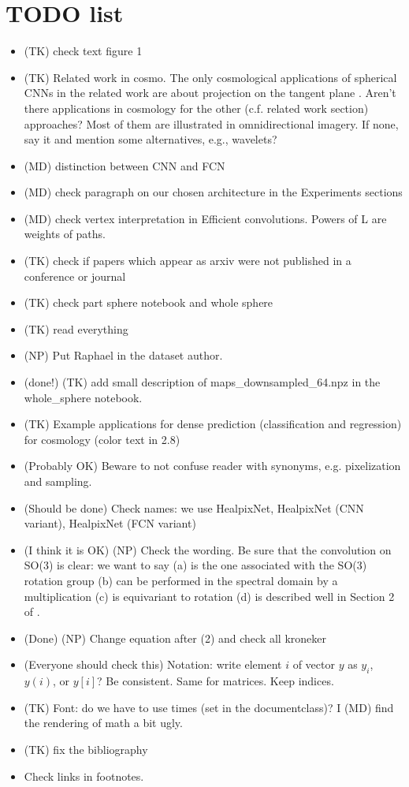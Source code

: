 \documentclass[final,twocolumn,3p,times,authoryear]{elsarticle}
\newcommand{\nati}[1]{{\color[rgb]{.1,.6,.1}{#1}}}
\newcommand{\1}{\b{1}}              %
\newcommand{\0}{\b{0}}              %
\begin{document}
\section*{TODO list}
\begin{itemize}[noitemsep,topsep=0pt,parsep=0pt,partopsep=0pt]
    \item (TK) check text figure 1
	\item (TK) Related work in cosmo. The only cosmological applications of spherical CNNs in the related work are about projection on the tangent plane \citep{schmelze2017cosmologicalmodel, fluri2018deep, gupta2018nongaussianinformation}. Aren't there applications in cosmology for the other (c.f. related work section) approaches? Most of them are illustrated in omnidirectional imagery. If none, say it and mention some alternatives, e.g., wavelets?
	\item (MD) distinction between CNN and FCN
	\item (MD) check paragraph on our chosen architecture in the Experiments sections
    \item (MD) check vertex interpretation in Efficient convolutions. Powers of L are weights of paths.
    \item (TK) check if papers which appear as arxiv were not published in a conference or journal
    \item (TK) check part sphere notebook and whole sphere
    \item (TK) read everything
    \item (NP) Put Raphael in the dataset author. 
    \item (done!) (TK) add small description of maps\_downsampled\_64.npz in the whole\_sphere notebook. \nati{We need to talk about that.}
	\item (TK) Example applications for dense prediction (classification and regression) for cosmology (color text in 2.8)
	\item (Probably OK) Beware to not confuse reader with synonyms, e.g. pixelization and sampling.
	\item (Should be done) Check names: we use HealpixNet, HealpixNet (CNN variant), HealpixNet (FCN variant)
    \item (I think it is OK) (NP) Check the wording. Be sure that the convolution on SO(3) is clear: we want to say (a) is the one associated with the SO(3) rotation group (b) can be performed  in the spectral domain by a multiplication (c) is equivariant to rotation (d) is described well in Section 2 of \citep{kondor2018clebsch}.
	\item (Done) (NP) Change equation after (2) and check all kroneker
	\item (Everyone should check this) Notation: write element $i$ of vector $y$ as $y_i$, $y(i)$, or $y[i]$? Be consistent. Same for matrices. Keep indices.
	\item (TK) Font: do we have to use times (set in the documentclass)? I (MD) find the rendering of math a bit ugly.
    \item (TK) fix the bibliography
    \item Check links in footnotes.

\end{itemize}
\end{document}
